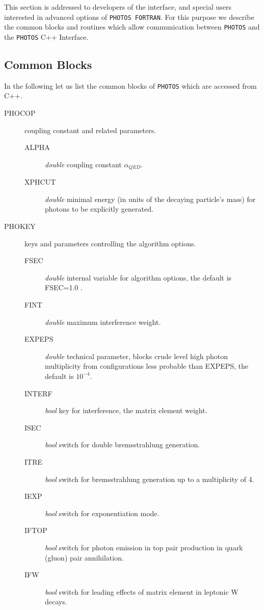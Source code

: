 \documentclass[]{Photos_interface_design}
\begin{document}
This section is addressed to developers of the interface, 
and special users interested in advanced options of {\tt PHOTOS FORTRAN}.
For this purpose we describe the common blocks and routines which allow
communication between {\tt PHOTOS} and the {\tt PHOTOS} C++ Interface.

\subsection{Common Blocks}

In the following let us list the common blocks of {\tt PHOTOS} which are accessed
from C++.

\begin{description}
\item[PHOCOP] coupling constant and related parameters.
    \begin{description}
	\item[ALPHA]  \textit{double} coupling constant $\alpha_{QED}$.
	\item[XPHCUT] \textit{double} minimal energy (in units of the decaying particle's mass) for photons to be explicitly generated.
    \end{description}
\end{description}

\begin{description}
\item[PHOKEY] keys and parameters controlling the algorithm options.
    \begin{description}
	\item[FSEC]   \textit{double} internal variable for algorithm options, the default is FSEC=1.0\; .
	\item[FINT]   \textit{double} maximum interference weight.
	\item[EXPEPS] \textit{double} technical parameter, blocks crude level high photon multiplicity from configurations less probable than EXPEPS, the default is $10^{-4}$.
	\item[INTERF] \textit{bool} key for interference, the matrix element weight.
	\item[ISEC]   \textit{bool} switch for double bremsstrahlung generation.
	\item[ITRE]   \textit{bool} switch for bremsstrahlung generation up to a multiplicity of 4.
	\item[IEXP]   \textit{bool} switch for exponentiation mode.
	\item[IFTOP]  \textit{bool} switch for photon emission in top pair production in quark (gluon) pair annihilation.
	\item[IFW]    \textit{bool} switch for leading effects of matrix element in leptonic W decays.
    \end{description}
\end{description}
\end{document}
